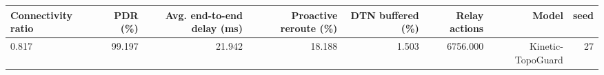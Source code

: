 \begin{tabular}{lrrrrrrr}
\toprule
Connectivity ratio & PDR (\%) & Avg. end-to-end delay (ms) & Proactive reroute (\%) & DTN buffered (\%) & Relay actions & Model & seed \\
\midrule
0.817 & 99.197 & 21.942 & 18.188 & 1.503 & 6756.000 & Kinetic-TopoGuard & 27 \\
\bottomrule
\end{tabular}